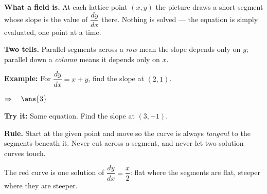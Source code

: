 \documentclass[12pt]{article}
\begin{document}


\begin{formulabox}
\textbf{What a field is.} At each lattice point $(x, y)$ the picture draws a
short segment whose slope is the value of $\dfrac{dy}{dx}$ there. Nothing is
solved --- the equation is simply evaluated, one point at a time.\par
\textbf{Two tells.} Parallel segments across a \emph{row} mean the slope depends
only on $y$; parallel down a \emph{column} means it depends only on $x$.
\end{formulabox}

\begin{examplebox}
\textbf{Example:} \quad For $\dfrac{dy}{dx} = x + y$, find the slope at $(2, 1)$.

$\Rightarrow\quad \ans{3}$
\end{examplebox}

\begin{tryitbox}
\textbf{Try it:} \quad Same equation. Find the slope at $(3, -1)$.\\[2pt]
\end{tryitbox}


\begin{formulabox}
\textbf{Rule.} Start at the given point and move so the curve is always
\emph{tangent} to the segments beneath it. Never cut across a segment, and never
let two solution curves touch.\par
\begin{center}
\end{center}
The red curve is one solution of $\dfrac{dy}{dx} = \dfrac{x}{2}$: flat where the
segments are flat, steeper where they are steeper.
\end{formulabox}
\end{document}
